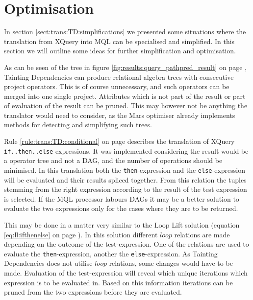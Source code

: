 \section{Optimisation}
\label{sect:disc:optimisations}

In section \ref{sect:trans:TD:simplifications} we presented some situations where the translation from XQuery into
MQL can be specialised and simplified. In this section we will outline some ideas for further simplification and
optimisation.

As can be seen of the tree in figure \ref{fig:results:query_pathpred_result} on page
\pageref{fig:results:query_pathpred_result}, Tainting Dependencies can produce
relational algebra trees with consecutive \textsf{project} operators. This is of course unnecessary, and such operators can be merged into one
single \textsf{project}. Attributes which is not part of the result or part of evaluation of the result can be
pruned. This may however not be anything the translator would need to consider, as the Mars optimiser already
implements methods for detecting and simplifying such trees.

Rule \ref{rule:trans:TD:conditional} on page \pageref{rule:trans:TD:conditional} describes the translation of
XQuery \texttt{if..then..else} expressions. It was implemented considering the result would be a operator tree and
not a DAG, and the number of operations should be minimised. In this translation both the \texttt{then}-expression
and the \texttt{else}-expression will be evaluated and their results spliced together. From this relation the
tuples stemming from the right expression according to the result of the test expression is selected. If the MQL
processor labours DAGs it may be a better solution to evaluate the two expressions only for the cases where they
are to be returned. 

This may be done in a matter very similar to the Loop Lift solution (equation
\ref{eq:ll:ifthenelse} on page \pageref{eq:ll:ifthenelse}). In this solution different $loop$ relations are made
depending on the outcome of the test-expression. One of the relations are used to evaluate the
\texttt{then}-expression, another the \texttt{else}-expression. As Tainting Dependencies does not utilise $loop$
relations, some changes would have to be made. Evaluation of the test-expression will reveal which unique
iterations which expression is to be evaluated in. Based on this information iterations can be pruned from the two
expressions before they are evaluated.

